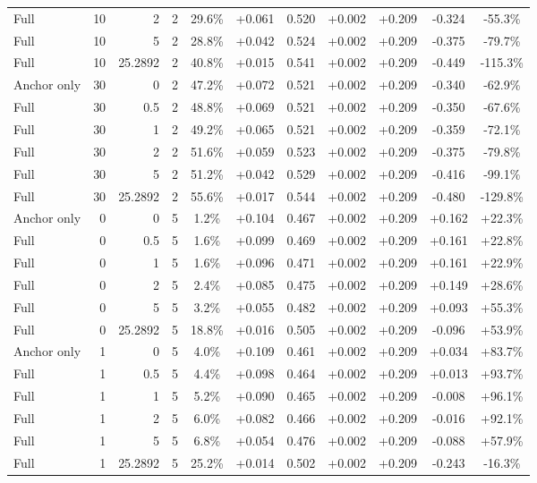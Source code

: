 \begin{table}[htbp]
\begin{tabular}{lrrrccccccc}
Full & 10 & 2 & 2 & 29.6\% & +0.061 & 0.520 & +0.002 & +0.209 & -0.324 & -55.3\% \\
Full & 10 & 5 & 2 & 28.8\% & +0.042 & 0.524 & +0.002 & +0.209 & -0.375 & -79.7\% \\
Full & 10 & 25.2892 & 2 & 40.8\% & +0.015 & 0.541 & +0.002 & +0.209 & -0.449 & -115.3\% \\
Anchor only & 30 & 0 & 2 & 47.2\% & +0.072 & 0.521 & +0.002 & +0.209 & -0.340 & -62.9\% \\
Full & 30 & 0.5 & 2 & 48.8\% & +0.069 & 0.521 & +0.002 & +0.209 & -0.350 & -67.6\% \\
Full & 30 & 1 & 2 & 49.2\% & +0.065 & 0.521 & +0.002 & +0.209 & -0.359 & -72.1\% \\
Full & 30 & 2 & 2 & 51.6\% & +0.059 & 0.523 & +0.002 & +0.209 & -0.375 & -79.8\% \\
Full & 30 & 5 & 2 & 51.2\% & +0.042 & 0.529 & +0.002 & +0.209 & -0.416 & -99.1\% \\
Full & 30 & 25.2892 & 2 & 55.6\% & +0.017 & 0.544 & +0.002 & +0.209 & -0.480 & -129.8\% \\
Anchor only & 0 & 0 & 5 & 1.2\% & +0.104 & 0.467 & +0.002 & +0.209 & +0.162 & +22.3\% \\
Full & 0 & 0.5 & 5 & 1.6\% & +0.099 & 0.469 & +0.002 & +0.209 & +0.161 & +22.8\% \\
Full & 0 & 1 & 5 & 1.6\% & +0.096 & 0.471 & +0.002 & +0.209 & +0.161 & +22.9\% \\
Full & 0 & 2 & 5 & 2.4\% & +0.085 & 0.475 & +0.002 & +0.209 & +0.149 & +28.6\% \\
Full & 0 & 5 & 5 & 3.2\% & +0.055 & 0.482 & +0.002 & +0.209 & +0.093 & +55.3\% \\
Full & 0 & 25.2892 & 5 & 18.8\% & +0.016 & 0.505 & +0.002 & +0.209 & -0.096 & +53.9\% \\
Anchor only & 1 & 0 & 5 & 4.0\% & +0.109 & 0.461 & +0.002 & +0.209 & +0.034 & +83.7\% \\
Full & 1 & 0.5 & 5 & 4.4\% & +0.098 & 0.464 & +0.002 & +0.209 & +0.013 & +93.7\% \\
Full & 1 & 1 & 5 & 5.2\% & +0.090 & 0.465 & +0.002 & +0.209 & -0.008 & +96.1\% \\
Full & 1 & 2 & 5 & 6.0\% & +0.082 & 0.466 & +0.002 & +0.209 & -0.016 & +92.1\% \\
Full & 1 & 5 & 5 & 6.8\% & +0.054 & 0.476 & +0.002 & +0.209 & -0.088 & +57.9\% \\
Full & 1 & 25.2892 & 5 & 25.2\% & +0.014 & 0.502 & +0.002 & +0.209 & -0.243 & -16.3\% \\

\end{tabular}
\end{table}
